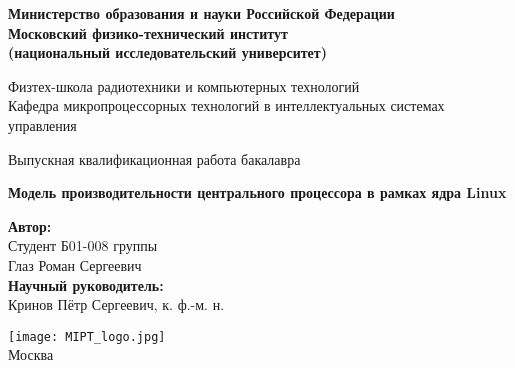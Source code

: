\begin{center}

    \large\textbf{Министерство образования и науки Российской Федерации         \\
    Московский физико-технический институт                                      \\
    (национальный исследовательский университет)}                               \\
    \vspace{1cm}

    Физтех-школа радиотехники и компьютерных технологий                         \\

    Кафедра микропроцессорных технологий в интеллектуальных системах управления \\

    \vspace{3em}

    Выпускная квалификационная работа бакалавра
\end{center}

\begin{center}
    \vspace{\fill}
    \textbf{\LARGE{Модель производительности центрального процессора в рамках ядра Linux}}
    \vspace{\fill}
\end{center}

\begin{flushright}
    \textbf{Автор:}                     \\
    Студент Б01-008 группы              \\
    Глаз Роман Сергеевич                \\
    \vspace{2em}
    \textbf{Научный руководитель:}      \\
    Кринов Пётр Сергеевич, к. ф.-м. н.  \\
\end{flushright}

\vspace{7em}

\begin{center}
    \texttt{[image: MIPT\_logo.jpg]}\\
    Москва \the\year{}
\end{center}

\thispagestyle{empty}
\newpage
\setcounter{page}{2}
\fancyfoot[c]{\thepage}

\fancyhead[L]{}
\fancyhead[R]{}
\fancyhead[C]{}
\renewcommand{\headrulewidth}{0pt}
